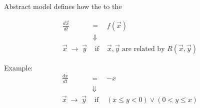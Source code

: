 \documentclass{seminar}
\begin{document}
\begin{slide}

Abstract model defines how the {}
{} to the {}

\begin{eqnarray}
 \frac{d\vec{x}}{dt} & = & f(\vec{x})
\\ & \Downarrow &
\\ 
 \vec{x}\;\rightarrow\;\vec{y} & \mbox{ if } &
 \vec{x},\vec{y} \mbox{ are related by } R(\vec{x},\vec{y})
\end{eqnarray}

\bigskip
Example:
\begin{eqnarray}
 \frac{dx}{dt} & = & -x
\\ & \Downarrow &
\\ 
 \vec{x}\;\rightarrow\;\vec{y} & \mbox{ if } &
(x \leq y < 0) \vee (0 < y \leq x) 
\end{eqnarray}

\end{slide}
\end{document}

